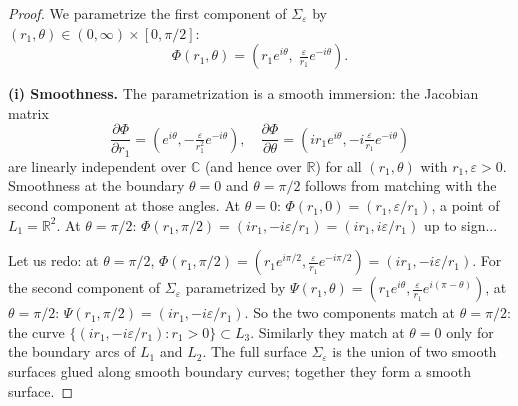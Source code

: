 \documentclass[12pt]{article}
\newcommand{\bR}{\mathbb{R}}
\newcommand{\bC}{\mathbb{C}}
\newcommand{\eps}{\varepsilon}
\begin{document}
\begin{proof}
We parametrize the first component of $\Sigma_\eps$ by $(r_1, \theta) \in (0,\infty) \times [0, \pi/2]$:
\[
  \Phi(r_1, \theta) = (r_1 e^{i\theta},\; \tfrac{\eps}{r_1} e^{-i\theta}).
\]

\textbf{(i) Smoothness.} The parametrization is a smooth immersion: the Jacobian matrix
\[
  \frac{\partial \Phi}{\partial r_1} = (e^{i\theta}, -\tfrac{\eps}{r_1^2} e^{-i\theta}),\quad
  \frac{\partial \Phi}{\partial \theta} = (ir_1 e^{i\theta}, -i\tfrac{\eps}{r_1} e^{-i\theta})
\]
are linearly independent over $\bC$ (and hence over $\bR$) for all $(r_1, \theta)$ with $r_1, \eps > 0$. Smoothness at the boundary $\theta = 0$ and $\theta = \pi/2$ follows from matching with the second component at those angles. At $\theta = 0$: $\Phi(r_1, 0) = (r_1, \eps/r_1)$, a point of $L_1 = \bR^2$. At $\theta = \pi/2$: $\Phi(r_1, \pi/2) = (ir_1, -i\eps/r_1) = (ir_1, i\eps/r_1)$ up to sign...

Let us redo: at $\theta = \pi/2$, $\Phi(r_1, \pi/2) = (r_1 e^{i\pi/2}, \tfrac{\eps}{r_1} e^{-i\pi/2}) = (ir_1, -i\eps/r_1)$. For the second component of $\Sigma_\eps$ parametrized by $\Psi(r_1, \theta) = (r_1 e^{i\theta}, \tfrac{\eps}{r_1} e^{i(\pi-\theta)})$, at $\theta = \pi/2$: $\Psi(r_1, \pi/2) = (ir_1, -i\eps/r_1)$. So the two components match at $\theta = \pi/2$: the curve $\{(ir_1, -i\eps/r_1) : r_1 > 0\} \subset L_3$. Similarly they match at $\theta = 0$ only for the boundary arcs of $L_1$ and $L_2$. The full surface $\Sigma_\eps$ is the union of two smooth surfaces glued along smooth boundary curves; together they form a smooth surface.


\end{proof}
\end{document}
